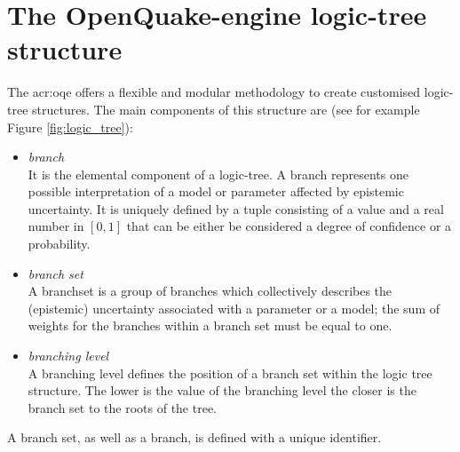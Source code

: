 \section{The OpenQuake-engine logic-tree structure}
\label{sec:lr_intro}
The \gls{acr:oqe} offers a flexible and modular methodology 
to create customised logic-tree structures. 
%
The main components of this structure are (see for example Figure 
\ref{fig:logic_tree}):
%
\begin{itemize}
    \item \emph{branch} \hfill \\
        It is the elemental component of a logic-tree. A branch
        represents one possible interpretation of a model or parameter 
        affected by epistemic uncertainty. It is uniquely defined by a tuple
        consisting of a value and a real number in $[0,1]$ that can be either
        be considered a degree of confidence or a probability.
    \item \emph{branch set} \hfill \\
        A \gls{branchset} is a group of branches which collectively 
        describes the (epistemic) uncertainty associated with a 
        parameter or a model; the sum of weights for the branches 
        within a branch set must be equal to one. 
    \item \emph{branching level} \hfill \\
        A branching level defines the position of a branch set within 
        the logic tree structure. The lower is the value of the 
        branching level the closer is the branch set to the roots of 
        the tree.
\end{itemize}
A branch set, as well as a \gls{branch}, is defined with a unique 
identifier. 

